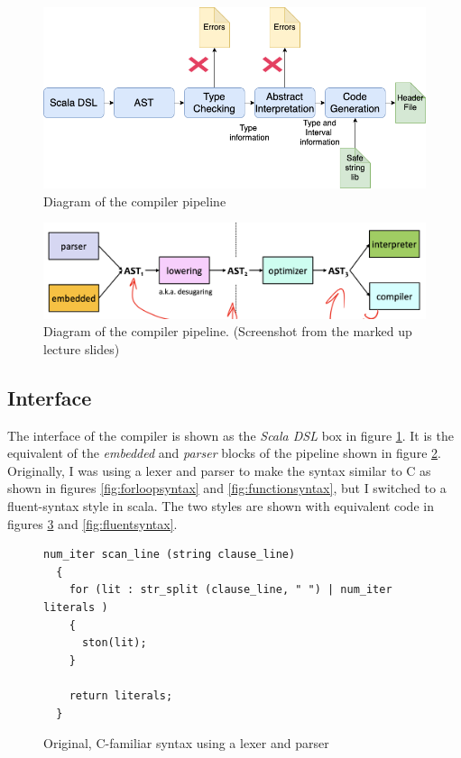 \documentclass[letterpaper]{article}
\begin{document}
\begin{figure}[h]
  \centering
  \includegraphics[width=\textwidth]{architecture.png}
  \caption{Diagram of the compiler pipeline}
  \label{fig:pipeline}
\end{figure}

\begin{figure}[h]
  \centering
  \includegraphics[width=\textwidth]{modern-compiler-pipeline.png}
  \caption{Diagram of the compiler pipeline. (Screenshot from the marked up lecture slides)}
  \label{fig:mdnpipeline}
\end{figure}


\subsection{Interface}

The interface of the compiler is shown as the \textit{Scala DSL} box in
figure \ref{fig:pipeline}. It is the equivalent of the \textit{embedded}
and \textit{parser} blocks of the pipeline shown in figure \ref{fig:mdnpipeline}.
Originally, I was using a lexer and parser to make the syntax similar to
C as shown in figures \ref{fig:forloopsyntax} and \ref{fig:functionsyntax}, but
I switched to a fluent-syntax style in scala. The two styles are shown with
equivalent code in figures \ref{fig:csyntax} and \ref{fig:fluentsyntax}.

\begin{figure}[h]
  \centering
  \begin{lstlisting}
num_iter scan_line (string clause_line)
  {
    for (lit : str_split (clause_line, " ") | num_iter literals )
    {
      ston(lit);
    }

    return literals;
  }
  \end{lstlisting}
  \caption{Original, C-familiar syntax using a lexer and parser}
  \label{fig:csyntax}
\end{figure}
\end{document}
